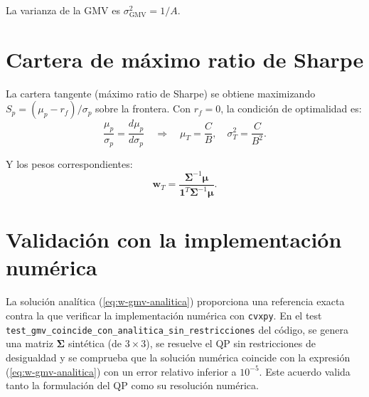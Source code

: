 La varianza de la GMV es $\sigma^2_{\text{GMV}} = 1/A$.

\section{Cartera de máximo ratio de Sharpe}

La cartera tangente (máximo ratio de Sharpe) se obtiene maximizando
$S_p = (\mu_p - r_f) / \sigma_p$ sobre la frontera. Con $r_f = 0$, la
condición de optimalidad es:
\begin{equation}
    \frac{\mu_p}{\sigma_p} = \frac{d\mu_p}{d\sigma_p}
    \quad \Longrightarrow \quad
    \boxed{\mu_T = \frac{C}{B}, \quad
           \sigma_T^2 = \frac{C}{B^2}}.
    \label{eq:max-sharpe-analitica}
\end{equation}

Y los pesos correspondientes:
\begin{equation}
    \boxed{\mathbf{w}_{T}
    = \frac{\boldsymbol{\Sigma}^{-1} \boldsymbol{\mu}}
           {\mathbf{1}^T \boldsymbol{\Sigma}^{-1} \boldsymbol{\mu}}.
    }
    \label{eq:w-tangente-analitica}
\end{equation}

\section{Validación con la implementación numérica}

La solución analítica (\ref{eq:w-gmv-analitica}) proporciona una
referencia exacta contra la que verificar la implementación numérica
con \texttt{cvxpy}. En el test
\texttt{test\_gmv\_coincide\_\allowbreak con\_\allowbreak analitica\_\allowbreak sin\_\allowbreak restricciones}
del código, se genera una matriz $\boldsymbol{\Sigma}$ sintética
(de $3 \times 3$), se resuelve el QP sin restricciones de desigualdad
y se comprueba que la solución numérica coincide con la expresión
(\ref{eq:w-gmv-analitica}) con un error relativo inferior a $10^{-5}$.
Este acuerdo valida tanto la formulación del QP como su resolución
numérica.
